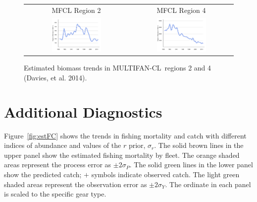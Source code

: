 \documentclass[12pt,letterpaper]{article}
\newcommand\MFCL{MULTIFAN-CL}
\begin{document}
\begin{figure}
\begin{center}
{\scriptsize \sffamily
\begin{tabular}{cc}
MFCL Region 2 & MFCL Region 4\\
\includegraphics[width=0.50\textwidth]{./annual_region_2_biomass.pdf} &
\includegraphics[width=0.50\textwidth]{./annual_region_4_biomass.pdf} \\
\end{tabular}
}
\end{center}
\caption{Estimated biomass trends in \MFCL\ regions 2 and 4 (Davies, et al. 2014).
\label{fig:mfclbiomass}
}
\end{figure}

\clearpage
\section{Additional Diagnostics}
\label{sec:diagnostics}

Figure~\ref{fig:estFC} shows the trends in fishing mortality and
catch with different indices of abundance and values of the $r$
prior, $\sigma_r$.
The solid brown lines in the upper panel show the estimated fishing
mortality by fleet. The orange shaded areas represent the process
error as $\pm 2\sigma_P$.
The solid green lines in the lower panel show the predicted catch; $+$
symbols indicate observed catch. 
The light green shaded areas represent the observation error as 
$\pm 2\sigma_Y$.
The ordinate in each panel is scaled to the specific gear type.
\end{document}
